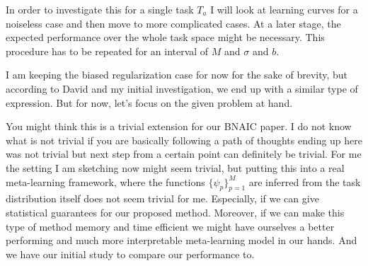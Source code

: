 \documentclass{tran-l}
\theoremstyle{definition}
\theoremstyle{remark}
\numberwithin{equation}{section}
\begin{document}
\rem In order to investigate this for a single task $T_a$ I will look at learning curves for a noiseless case and then move to more complicated cases.  At a later stage, the expected performance over the whole task space might be necessary. This procedure has to be repeated for an interval of $M$ and $\sigma$ and $b$.

\rem I am keeping the biased regularization case for now for the sake of brevity, but according to David and my initial investigation, we end up with a similar type of expression. But for now, let's focus on the given problem at hand.

\rem You might think this is a trivial extension for our BNAIC paper. I do not know what is not trivial if you are basically following a path of thoughts ending up here was not trivial but next step from a certain point can definitely be trivial. For me the setting I am sketching now might seem trivial, but putting this into a real meta-learning framework, where the functions $\{\psi_p\}_{p=1}^M$ are inferred from the task distribution itself does not seem trivial for me. Especially, if we can give statistical guarantees for our proposed method. Moreover, if we can make this type of method memory and time efficient we might have ourselves a better performing and much more interpretable meta-learning model in our hands. And we have our initial study to compare our performance to.
\end{document}
